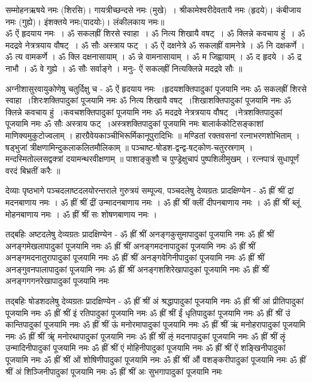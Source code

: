 सम्मोहनऋषये नमः (शिरसि)। गायत्रीच्छन्दसे नमः (मुखे)~। श्रीकामेश्वरीदेवतायै नमः (हृदये)। कंबीजाय नमः (गुह्ये)। इंशक्तये नमः(पादयोः)।
लंकीलकाय नमः॥\\
ॐ ऐं हृदयाय नमः~। ॐ सकलह्रीं शिरसे स्वाहा~। ॐ नित्य शिखायै वषट्~। ॐ क्लिन्ने कवचाय हुं~। ॐ मदद्रवे नेत्रत्रयाय वौषट्~। ॐ सौः अस्त्राय फट्~।
ॐ ऐं दक्षनेत्रे ॐ सकलह्रीं वामनेत्रे । ॐ नि दक्षकर्णे । ॐ त्य वामकर्णे । ॐ क्लि दक्षनासायाम् । ॐ न्ने वामनासायाम् । ॐ म जिह्वायाम् । ॐ द हृदये । ॐ द्र नाभौ । ॐ वे गुह्ये । ॐ सौः सर्वाङ्गे ।
मनुः- ऐं सकलह्रीं नित्यक्लिन्ने मदद्रवे सौः ॥

अग्नीशासुरवायुकोणेषु चतुर्दिक्षु च -
ॐ ऐं हृदयाय नमः~।हृदयशक्तिपादुकां पूजयामि नमः
ॐ सकलह्रीं शिरसे स्वाहा~।शिरःशक्तिपादुकां पूजयामि नमः
ॐ नित्य शिखायै वषट्~।शिखाशक्तिपादुकां पूजयामि नमः
ॐ क्लिन्ने कवचाय हुं~।कवचशक्तिपादुकां पूजयामि नमः
ॐ मदद्रवे नेत्रत्रयाय वौषट्~।नेत्रशक्तिपादुकां पूजयामि नमः
ॐ सौः अस्त्राय फट्~।अस्त्रशक्तिपादुकां पूजयामि नमः
बालार्ककोटिसङ्काशां माणिक्यमुकुटोज्वलाम् ।
हारग्रैवेयकाञ्चीभिरूर्मिकानूपुरादिभिः ॥
मण्डितां रक्तवसनां रत्नाभरणशोभिताम् ।
षड्भुजां त्रीक्षणामिन्दुकलाकलितमौलिकाम् ॥
पञ्चाष्ट-षोडश-द्वन्द्व-षट्कोण-चतुरस्रगाम् ।
मन्दस्मितोल्लसद्वक्त्रां दयामन्थरवीक्षणाम् ॥
पाशाङ्कुशौ च पुण्ड्रेक्षुचापं पुष्पशिलीमुखम् ।
रत्नपात्रं सुधापूर्णं वरदं बिभ्रतीं करैः ॥

देव्याः पृष्ठभागे पञ्चदलाष्टदलयोरन्तराले गुरुत्रयं सम्पूज्य,
पञ्चदलेषु देव्यग्रतः प्रादक्षिण्येन -	
ॐ ह्रीं श्रीं द्रां मदनबाणाय नमः ।
ॐ ह्रीं श्रीं द्रीं उन्मादनबाणाय नमः ।
ॐ ह्रीं श्रीं क्लीं दीपनबाणाय नमः ।
ॐ ह्रीं श्रीं ब्लूं मोहनबाणाय नमः ।
ॐ ह्रीं श्रीं सः शोषणबाणाय नमः ।

तद्बहिः अष्टदलेषु देव्यग्रतः प्रादक्षिण्येन -
ॐ ह्रीं श्रीं अनङ्गकुसुमापादुकां पूजयामि नमः
ॐ ह्रीं श्रीं अनङ्गमेखलापादुकां पूजयामि नमः
ॐ ह्रीं श्रीं अनङ्गमदनापादुकां पूजयामि नमः
ॐ ह्रीं श्रीं अनङ्गमदनातुरापादुकां पूजयामि नमः
ॐ ह्रीं श्रीं अनङ्गवेगिनीपादुकां पूजयामि नमः
ॐ ह्रीं श्रीं अनङ्गुवनपालापादुकां पूजयामि नमः
ॐ ह्रीं श्रीं अनङ्गशशिरेखापादुकां पूजयामि नमः
ॐ ह्रीं श्रीं अनङ्गगगनरेखापादुकां पूजयामि नमः

तद्बहिः षोडशदलेषु देव्यग्रतः प्रादक्षिण्येन -
ॐ ह्रीं श्रीं अं श्रद्धापादुकां पूजयामि नमः
ॐ ह्रीं श्रीं आं प्रीतिपादुकां पूजयामि नमः
ॐ ह्रीं श्रीं इं रतिपादुकां पूजयामि नमः
ॐ ह्रीं श्रीं ईं धृतिपादुकां पूजयामि नमः
ॐ ह्रीं श्रीं उं कान्तिपादुकां पूजयामि नमः
ॐ ह्रीं श्रीं ऊं मनोरमापादुकां पूजयामि नमः
ॐ ह्रीं श्रीं ऋं मनोहरापादुकां पूजयामि नमः
ॐ ह्रीं श्रीं ॠं मनोरथापादुकां पूजयामि नमः
ॐ ह्रीं श्रीं ऌं मदनापादुकां पूजयामि नमः
ॐ ह्रीं श्रीं ऌृं उन्मादिनीपादुकां पूजयामि नमः
ॐ ह्रीं श्रीं एं मोहिनीपादुकां पूजयामि नमः
ॐ ह्रीं श्रीं ऐं शङ्खिनीपादुकां पूजयामि नमः
ॐ ह्रीं श्रीं ओं शोषिणीपादुकां पूजयामि नमः
ॐ ह्रीं श्रीं औं वशङ्करीपादुकां पूजयामि नमः
ॐ ह्रीं श्रीं अं शिञ्जिनीपादुकां पूजयामि नमः
ॐ ह्रीं श्रीं अः सुभगापादुकां पूजयामि नमः

